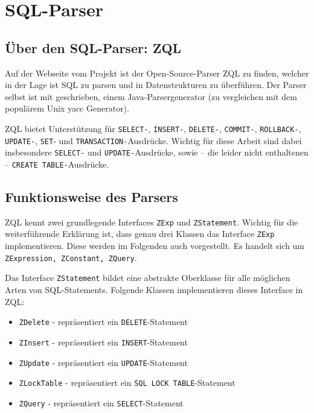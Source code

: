\section{SQL-Parser}

\subsection{Über den SQL-Parser: ZQL}

	Auf der Webseite vom \cite{zql1} Projekt ist der Open-Source-Parser ZQL zu finden, welcher in der Lage ist SQL zu parsen und in Datenstrukturen zu überführen. Der Parser selbst ist mit \cite{javacc1} geschrieben, einem  Java-Parsergenerator (zu vergleichen mit dem populärem Unix yacc Generator).

ZQL bietet Unterstützung für \verb|SELECT-|, \verb|INSERT-|, \verb|DELETE-|, \verb|COMMIT-|, \verb|ROLLBACK-|, \verb|UPDATE-|, \verb|SET|- und \verb|TRANSACTION-|Ausdrücke. Wichtig für diese Arbeit sind dabei insbesondere \verb|SELECT-| und \verb|UPDATE-|Ausdrücke, sowie -- die leider nicht enthaltenen -- \verb|CREATE TABLE-|Ausdrücke.

\subsection{Funktionsweise des Parsers}
\label{subsec:funktionparser}

ZQL kennt zwei grundlegende Interfaces \verb|ZExp| und \verb|ZStatement|. Wichtig für die weiterführende Erklärung ist, dass genau drei Klassen das Interface \verb|ZExp| implementieren. Diese werden im Folgenden auch vorgestellt. Es handelt sich um \verb|ZExpression, ZConstant, ZQuery|.

Das Interface \verb|ZStatement| bildet eine abstrakte Oberklasse für alle möglichen Arten von SQL-Statements. Folgende Klassen implementieren dieses Interface in ZQL:

\begin{itemize}
\item \verb|ZDelete| - repräsentiert ein \verb|DELETE|-Statement
\item \verb|ZInsert| - repräsentiert ein \verb|INSERT|-Statement
\item \verb|ZUpdate| - repräsentiert ein \verb|UPDATE|-Statement
\item \verb|ZLockTable| - repräsentiert ein \verb|SQL LOCK TABLE|-Statement
\item \verb|ZQuery| - repräsentiert ein \verb|SELECT|-Statement
\end{itemize}

